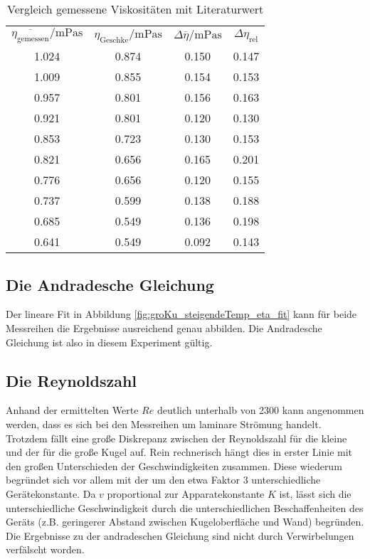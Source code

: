 \begin{table}
    \centering
    \caption{Vergleich gemessene Viskositäten mit Literaturwert \cite[][290]{geschke}}
    \label{tab:viskositaeten_vergleich}
    \begin{tabular}[]{S S S S}
        \toprule
        {$\overline{\eta_\text{gemessen}} / \unit{\milli\pascal\s}$}%
        &{$\eta_\text{Geschke}/\unit{\milli\pascal\s}$ \cite[][]{geschke}} %
        &{$\Delta \overline{\eta}/ \unit{\milli\pascal\s}$}%
        &{$\Delta \eta_\text{rel}$}\\
        1.024  & 0.874 & 0.150 &  0.147\\
        1.009  & 0.855 & 0.154 &  0.153\\
        0.957  & 0.801 & 0.156 &  0.163\\
        0.921  & 0.801 & 0.120 &  0.130\\
        0.853  & 0.723 & 0.130 &  0.153\\
        0.821  & 0.656 & 0.165 &  0.201\\
        0.776  & 0.656 & 0.120 &  0.155\\
        0.737  & 0.599 & 0.138 &  0.188\\
        0.685  & 0.549 & 0.136 &  0.198\\
        0.641  & 0.549 & 0.092 &  0.143\\
    \end{tabular}
\end{table}


\subsection[]{Die Andradesche Gleichung}
Der lineare Fit in Abbildung \ref{fig:groKu_steigendeTemp_eta_fit} kann für beide Messreihen die
Ergebnisse ausreichend genau abbilden. 
Die Andradesche Gleichung ist also in diesem Experiment gültig.

\subsection[]{Die Reynoldszahl}
Anhand der ermittelten Werte $Re$ deutlich unterhalb von 2300 kann angenommen werden, dass es sich bei den Messreihen um laminare Strömung handelt.
Trotzdem fällt eine große Diskrepanz zwischen der Reynoldszahl für die kleine und der für die große Kugel auf.
Rein rechnerisch hängt dies in erster Linie mit den großen Unterschieden der Geschwindigkeiten zusammen.
Diese wiederum begründet sich vor allem mit der um den etwa Faktor 3 unterschiedliche Gerätekonstante.
Da $v$ proportional zur Apparatekonstante $K$ ist, lässt sich die unterschiedliche Geschwindigkeit 
durch die unterschiedlichen Beschaffenheiten des Geräts (z.B. geringerer Abstand zwischen Kugeloberfläche und Wand) begründen.
Die Ergebnisse zu der andradeschen Gleichung sind nicht durch Verwirbelungen verfälscht worden.

